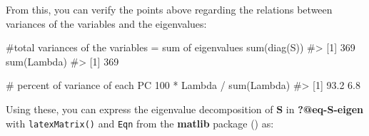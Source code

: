 \documentclass[
  letterpaper,
  10pt,
  krantz2]{krantz}
\makeatletter
\newenvironment{Shaded}{\begin{snugshade}}{\end{snugshade}}
\newcommand{\CommentTok}[1]{\textcolor[rgb]{0.37,0.37,0.37}{#1}}
\newcommand{\DecValTok}[1]{\textcolor[rgb]{0.68,0.00,0.00}{#1}}
\newcommand{\FunctionTok}[1]{\textcolor[rgb]{0.28,0.35,0.67}{#1}}
\newcommand{\NormalTok}[1]{\textcolor[rgb]{0.00,0.23,0.31}{#1}}
\newcommand{\OtherTok}[1]{\textcolor[rgb]{0.00,0.23,0.31}{#1}}
\newcommand{\SpecialCharTok}[1]{\textcolor[rgb]{0.37,0.37,0.37}{#1}}
\newenvironment{kframe}{%
  \medskip{}
  \setlength{\fboxsep}{.8em}
  \def\at@end@of@kframe{}%
  \ifinner\ifhmode%
  \def\at@end@of@kframe{\end{minipage}}%
  \begin{minipage}{\columnwidth}%
  \fi\fi%
  \def\FrameCommand##1{\hskip\@totalleftmargin \hskip-\fboxsep
  \colorbox{shadecolor}{##1}\hskip-\fboxsep
      \hskip-\linewidth \hskip-\@totalleftmargin \hskip\columnwidth}%
  \MakeFramed {\advance\hsize-\width
    \@totalleftmargin\z@ \linewidth\hsize
    \@setminipage}}%
{\par\unskip\endMakeFramed%
  \at@end@of@kframe}
\renewenvironment{Shaded}{\begin{kframe}}{\end{kframe}}
\makeatother
\begin{document}
\begin{Shaded}
\end{Shaded}

From this, you can verify the points above regarding the relations
between variances of the variables and the eigenvalues:

\begin{Shaded}
\begin{Highlighting}[]
\CommentTok{\#total variances of the variables = sum of eigenvalues}
\FunctionTok{sum}\NormalTok{(}\FunctionTok{diag}\NormalTok{(S))}
\CommentTok{\#\textgreater{} [1] 369}
\FunctionTok{sum}\NormalTok{(Lambda)}
\CommentTok{\#\textgreater{} [1] 369}

\CommentTok{\# percent of variance of each PC}
\DecValTok{100} \SpecialCharTok{*}\NormalTok{ Lambda }\SpecialCharTok{/} \FunctionTok{sum}\NormalTok{(Lambda)}
\CommentTok{\#\textgreater{} [1] 93.2  6.8}
\end{Highlighting}
\end{Shaded}

Using these, you can express the eigenvalue decomposition of
\(\mathbf{S}\) in \textbf{?@eq-S-eigen} with \texttt{latexMatrix()} and
\texttt{Eqn} from the \textbf{matlib} package
() as:
\end{document}
